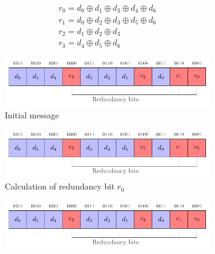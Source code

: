 \begin{equation} \label{equat:hamming_encoder}
    \begin{split}
        r_{0} = d_{0} \oplus d_{1} \oplus d_{3} \oplus d_{4} \oplus d_{6} \\
        r_{1} = d_{0} \oplus d_{2} \oplus d_{3} \oplus d_{5} \oplus d_{6} \\
        r_{2} = d_{1} \oplus d_{2} \oplus d_{3} \\
        r_{3} = d_{4} \oplus d_{5} \oplus d_{6}
    \end{split}
\end{equation}

\begin{figure}[ht]
    \centering
    \begin{subfigure}[b]{0.49\textwidth}
        \includegraphics[width=\textwidth, page=2]{c5_countermeasures_dift/img/hamming_bit.pdf}
        \caption{Initial message}
        \label{fig:hamming_code_example_1}
    \end{subfigure}
    \hfill
    \begin{subfigure}[b]{0.49\textwidth}
        \includegraphics[width=\textwidth, page=4]{c5_countermeasures_dift/img/hamming_bit.pdf}
        \caption{Calculation of redundancy bit $r_0$}
        \label{fig:hamming_code_example_2}
    \end{subfigure}
    \hfill
    \begin{subfigure}[b]{0.49\textwidth}
        \includegraphics[width=\textwidth, page=6]{c5_countermeasures_dift/img/hamming_bit.pdf}

\end{subfigure}
\end{figure}
